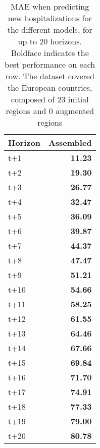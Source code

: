 \begin{table}[H]
\centering
\caption{MAE when predicting new hospitalizations for the different models, for up to 20 horizons. Boldface indicates the best performance on each row. The dataset covered the European countries, composed of 23 initial regions and 0 augmented regions }
\label{tab:MAE_comparison}
\begin{tabular}{lr}
\toprule
Horizon &  Assembled \\
\midrule
t+1  & \textbf{11.23}  \\
t+2  & \textbf{19.30}  \\
t+3  & \textbf{26.77}  \\
t+4  & \textbf{32.47}  \\
t+5  & \textbf{36.09}  \\
t+6  & \textbf{39.87}  \\
t+7  & \textbf{44.37}  \\
t+8  & \textbf{47.47}  \\
t+9  & \textbf{51.21}  \\
t+10  & \textbf{54.66}  \\
t+11  & \textbf{58.25}  \\
t+12  & \textbf{61.55}  \\
t+13  & \textbf{64.46}  \\
t+14  & \textbf{67.66}  \\
t+15  & \textbf{69.84}  \\
t+16  & \textbf{71.70}  \\
t+17  & \textbf{74.91}  \\
t+18  & \textbf{77.33}  \\
t+19  & \textbf{79.00}  \\
t+20  & \textbf{80.78}  \\

\bottomrule
\end{tabular}
\end{table}

